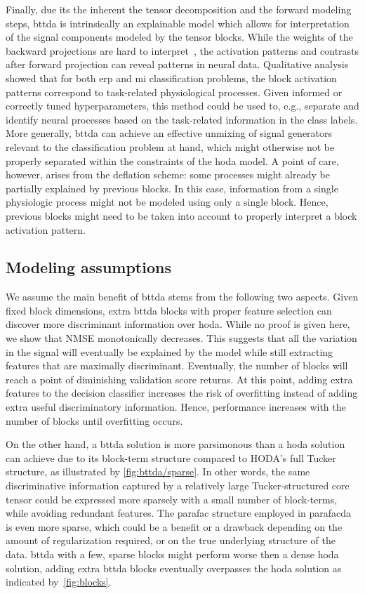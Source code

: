 \documentclass[twocolumn]{article}
\begin{document}
Finally, due its the inherent the tensor decomposition and the forward modeling
steps, \ac{bttda} is intrinsically an explainable model which allows for interpretation
of the signal components modeled by the tensor blocks.
While the weights of the backward projections are
hard to interpret~\cite{Haufe2014}, the activation patterns and contrasts after
forward projection can reveal patterns in neural data.
Qualitative analysis showed that for both \ac{erp} and \ac{mi} classification
problems, the block activation patterns correspond to task-related
physiological processes.
Given informed or correctly tuned hyperparameters, this method could be used to,
e.g., separate and identify neural processes based on the task-related
information in the class labels.
More generally, \ac{bttda} can achieve an effective unmixing of signal generators
relevant to the classification problem at hand, which might otherwise not be
properly separated within the constraints of the \ac{hoda} model.
A point of care, however, arises from the deflation scheme: some processes
might already be partially explained by previous blocks.
In this case, information from a single physiologic process might not be modeled
using only a single block.
Hence, previous blocks might need to be taken into account to properly interpret
a block activation pattern.

\subsection{Modeling assumptions}

We assume the main benefit of \ac{bttda} stems from the following two aspects.
Given fixed block dimensions, extra \ac{bttda} blocks with proper feature selection
can discover more discriminant information over \ac{hoda}.
While no proof is given here, we show that NMSE monotonically decreases.
This suggests that all the variation in the signal will eventually be explained
by the model while still extracting features that are maximally discriminant.
Eventually, the number of blocks will reach a point of diminishing validation
score returns.
At this point, adding extra features to the decision classifier increases
the risk of overfitting instead of adding extra useful discriminatory
information.
Hence, performance increases with the number of blocks until overfitting occurs.

On the other hand, a \ac{bttda} solution is more parsimonous than a \ac{hoda}
solution can achieve due to its block-term structure compared to HODA's full Tucker
structure, as illustrated	by \cref{fig:bttda/sparse}.
In other words, the same discriminative information captured by a relatively large
Tucker-structured core tensor could be expressed more sparsely with a small
number of block-terms, while avoiding redundant features.
The \ac{parafac} structure employed in \ac{parafacda} is even more sparse, which could be
a benefit or a drawback depending on the amount of regularization required,
or on the true underlying structure of the data.
\Ac{bttda} with a few, sparse blocks might perform worse then a dense \ac{hoda}
solution, adding extra \ac{bttda} blocks eventually overpasses the \ac{hoda}
solution as indicated by~\cref{fig:blocks}.
\end{document}
